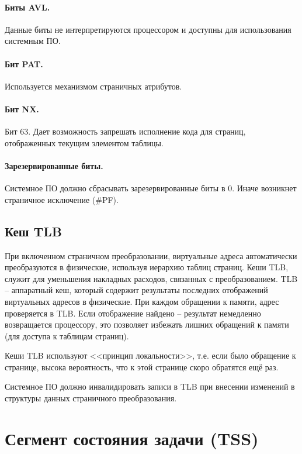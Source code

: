 \paragraph{Биты AVL.} Данные биты не интерпретируются процессором и доступны для использования системным ПО.

\paragraph{Бит PAT.} Используется механизмом страничных атрибутов.

\paragraph{Бит NX.} Бит 63. Дает возможность запрешать исполнение кода для страниц, отображенных текущим элементом таблицы.

\paragraph{Зарезервированные биты.} Системное ПО должно сбрасывать зарезервированные биты в 0. Иначе возникнет
страничное исключение (\#PF).

\subsection{Кеш TLB}
При включенном страничном преобразовании, виртуальные адреса автоматически преобразуются в физические,
используя иерархию таблиц страниц. Кеши TLB, служит для уменьшения накладных расходов, связанных с преобразованием.
TLB -- аппаратный кеш, который содержит результаты последних отображений виртуальных адресов в физические.
При каждом обращении к памяти, адрес проверяется в TLB. Если отображение найдено -- результат немедленно возвращается
процессору, это позволяет избежать лишних обращений к памяти (для доступа к таблицам страниц).

Кеши TLB используют <<принцип локальности>>, т.е. если было обращение к странице, высока вероятность, что к этой
странице скоро обратятся ещё раз.

Системное ПО должно инвалидировать записи в TLB при внесении изменений
в структуры данных страничного преобразования.

\section{Сегмент состояния задачи (TSS)}
